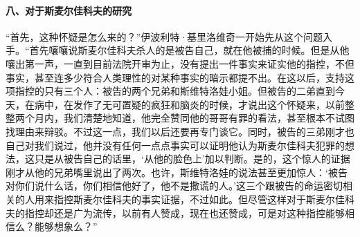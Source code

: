\paragraph*{八、对于斯麦尔佳科夫的研究}
\par “首先，这种怀疑是怎么来的？”伊波利特·基里洛维奇一开始先从这个问题入手。“首先嚷嚷说斯麦尔佳科夫杀人的是被告自己，就在他被捕的时候。但是从他嚷出第一声，一直到目前法院开审为止，没有提出一件事实来证实他的指控，不但事实，甚至连多少符合人类理性的对某种事实的暗示都提不出。在这以后，支持这项指控的只有三个人：被告的两个兄弟和斯维特洛娃小姐。但被告的二弟直到今天，在病中，在发作了无可置疑的疯狂和脑炎的时候，才说出这个怀疑来，以前整整两个月内，我们清楚地知道，他完全赞同他的哥哥有罪的看法，甚至根本不试图找理由来辩驳。不过这一点，我们以后还要再专门谈它。同时，被告的三弟刚才也自己对我们说过，他并没有任何一点点事实可以证明他认为斯麦尔佳科夫犯罪的想法，这只是从被告自己的话里，‘从他的脸色上’加以判断。是的，这个惊人的证据刚才从他的兄弟嘴里说出了两次。也许，斯维特洛娃的说法甚至更加惊人：‘被告对你们说什么话，你们相信他好了，他不是撒谎的人。’这三个跟被告的命运密切相关的人用来指控斯麦尔佳科夫的事实证据，不过如此。但尽管这样对于斯麦尔佳科夫的指控却还是广为流传，以前有人赞成，现在也还赞成，可是对这种指控能够相信么？能够想象么？”
